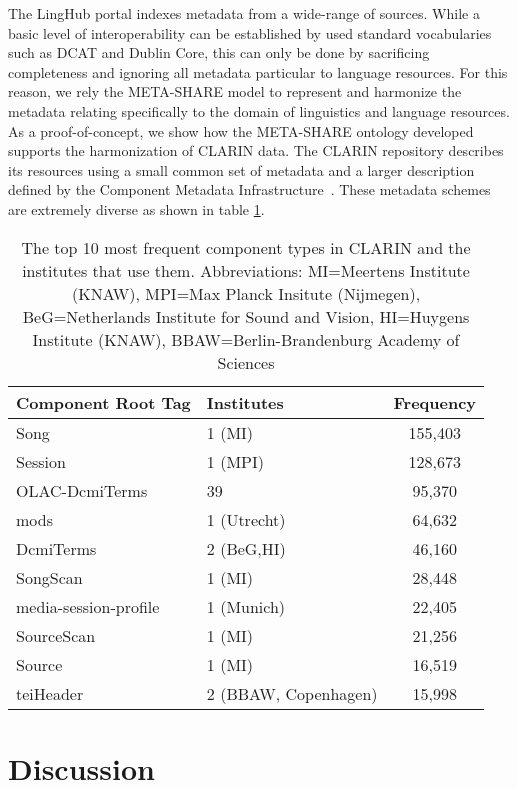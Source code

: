\documentclass{llncs}
\begin{document}
{The LingHub portal indexes metadata from a wide-range of sources. While a basic level of interoperability can be established by used standard vocabularies such as DCAT and Dublin Core, this can only be done by sacrificing completeness and ignoring all metadata particular to language resources. For this reason, we rely the META-SHARE model to represent and harmonize the metadata relating specifically to the domain of linguistics and language resources. As a proof-of-concept, we show how the META-SHARE ontology developed supports the harmonization of CLARIN data. The
CLARIN repository describes its resources using a small common set of metadata
and a larger description defined by the Component Metadata
Infrastructure~\cite[CMDI]{broeder2012cmdi}. These metadata schemes are
extremely diverse as shown in table \ref{tab:clarin-types}.
\begin{table}
\begin{center}
\begin{tabular}{l|lc}
Component Root Tag & Institutes & Frequency \\
\hline
Song & 1 (MI) & 155,403 \\
Session & 1 (MPI) & 128,673 \\
OLAC-DcmiTerms & 39 & 95,370 \\
mods & 1 (Utrecht)& 64,632 \\
DcmiTerms & 2 (BeG,HI) & 46,160 \\
SongScan & 1 (MI) & 28,448 \\
media-session-profile & 1 (Munich) & 22,405 \\
SourceScan & 1 (MI) & 21,256 \\
Source & 1 (MI) & 16,519 \\
teiHeader & 2 (BBAW, Copenhagen) & 15,998 \\
\end{tabular}
\end{center}
\caption{\label{tab:clarin-types}The top 10 most frequent component types in
CLARIN and the institutes that use them. Abbreviations: MI=Meertens Institute (KNAW),
MPI=Max Planck Insitute (Nijmegen), BeG=Netherlands Institute for Sound and Vision,
HI=Huygens Institute (KNAW), BBAW=Berlin-Brandenburg Academy of Sciences}
\end{table}
\section{Discussion}
\label{sec:discussion}
}
\end{document}
